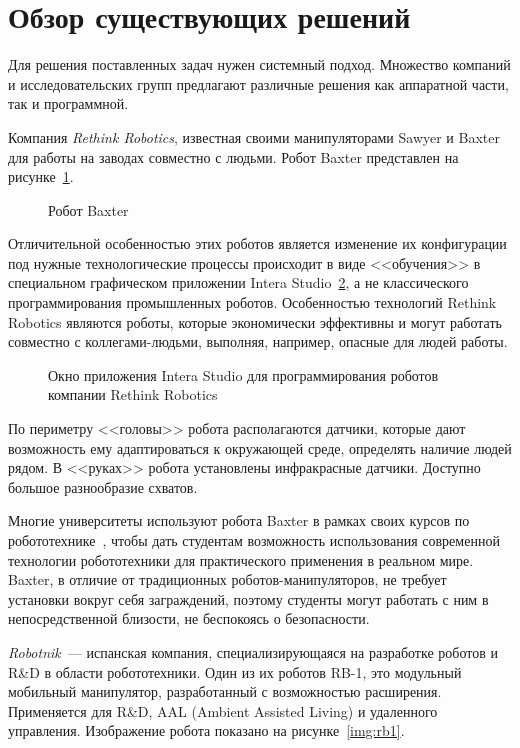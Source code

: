 \section{Обзор существующих решений}

Для решения поставленных задач нужен системный подход. Множество компаний и исследовательских групп предлагают различные решения как аппаратной части, так и программной.
 
Компания \textit{Rethink Robotics}, известная своими манипуляторами Sawyer и Baxter~\cite{baxter} для работы на заводах совместно с людьми. Робот Baxter представлен на рисунке~\ref{img:baxter}.

\begin{figure}[h!]
	\caption{Робот Baxter}
	\label{img:baxter}
\end{figure}

Отличительной особенностью этих роботов является изменение их конфигурации под нужные технологические процессы происходит в виде <<обучения>> в специальном графическом приложении Intera Studio~\ref{img:intera}, а не классического программирования промышленных роботов. Особенностью технологий Rethink Robotics являются роботы, которые экономически эффективны и могут работать совместно с коллегами-людьми, выполняя, например, опасные для людей работы. 

\begin{figure}[h!]
	\caption{Окно приложения Intera Studio для программирования роботов компании Rethink Robotics}
	\label{img:intera}
\end{figure}

По периметру <<головы>> робота располагаются датчики, которые дают возможность ему адаптироваться к окружающей среде, определять наличие людей рядом. В <<руках>> робота установлены инфракрасные датчики. Доступно большое разнообразие схватов.

Многие университеты используют робота Baxter в рамках своих курсов по робототехнике~\cite{baxteruse}, чтобы дать студентам возможность использования современной технологии робототехники для практического применения в реальном мире. Baxter, в отличие от традиционных роботов-манипуляторов, не требует установки вокруг себя заграждений, поэтому студенты могут работать с ним в непосредственной близости, не беспокоясь о безопасности.

\textit{Robotnik}~--- испанская компания, специализирующаяся на разработке роботов и R\&D в области робототехники. Один из их роботов RB-1, это модульный мобильный манипулятор, разработанный с возможностью расширения. Применяется  для R\&D, AAL (Ambient Assisted Living) и удаленного управления. Изображение робота показано на рисунке~\ref{img:rb1}.

